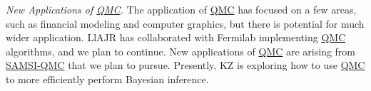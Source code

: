 \documentclass[11pt]{NSFamsart}
\newcommand{\QMC}{\hyperlink{QMClink}{QMC}\xspace}
\newcommand{\SAMSIQMC}{\hyperlink{SAMSIlink}{SAMSI-QMC}\xspace}
\begin{document}
\emph{New Applications of \QMC.}
The application of \QMC has focused on a few areas, such as financial modeling and computer 
graphics, but there is 
potential for much wider application.  LlAJR has collaborated with Fermilab implementing \QMC 
algorithms, and we plan to continue.    New applications of \QMC are arising from \SAMSIQMC that 
we plan to pursue.  Presently, KZ is exploring how to use \QMC to more efficiently perform Bayesian 
inference.



\newpage
\clearpage
\setcounter{page}{1}




{\renewcommand\addcontentsline[3]{} 
\renewcommand{\refname}{{\Large\textbf{References Cited}}}                   %
\renewcommand{\bibliofont}{\normalsize}

}
\end{document}
